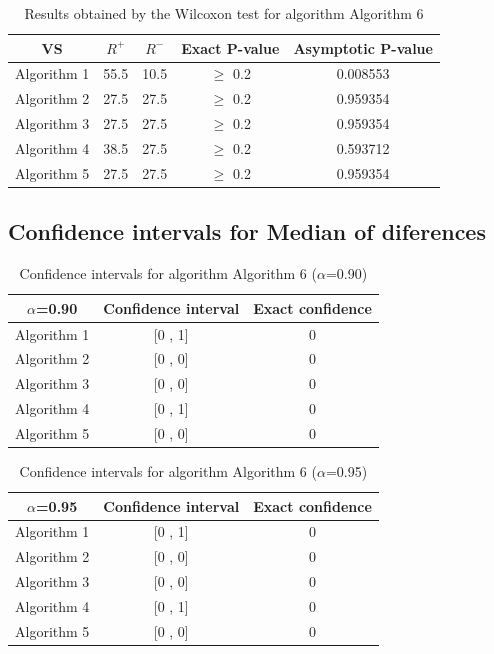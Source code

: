 \documentclass[a4paper,10pt]{article}
\begin{document}
\begin{table}[!htp]
\centering\small
\begin{tabular}{
|c|c|c|c|c|}
\hline
 VS & $R^{+}$ & $R^{-}$ & Exact P-value & Asymptotic P-value \\ \hline 
Algorithm 1 & 55.5 & 10.5 & $\geq$ 0.2 & 0.008553\\ \hline 
Algorithm 2 & 27.5 & 27.5 & $\geq$ 0.2 & 0.959354\\ \hline 
Algorithm 3 & 27.5 & 27.5 & $\geq$ 0.2 & 0.959354\\ \hline 
Algorithm 4 & 38.5 & 27.5 & $\geq$ 0.2 & 0.593712\\ \hline 
Algorithm 5 & 27.5 & 27.5 & $\geq$ 0.2 & 0.959354\\ \hline 

\end{tabular}
\caption{Results obtained by the Wilcoxon test for algorithm Algorithm 6}
\end{table}

\subsection{Confidence intervals for Median of diferences}

\begin{table}[!htp]
\centering\small
\begin{tabular}{
|c|c|c|}
\hline
 $\alpha$=0.90 & Confidence interval & Exact confidence \\ \hline 
Algorithm 1 & [0 , 1] & 0\\ \hline 
Algorithm 2 & [0 , 0] & 0\\ \hline 
Algorithm 3 & [0 , 0] & 0\\ \hline 
Algorithm 4 & [0 , 1] & 0\\ \hline 
Algorithm 5 & [0 , 0] & 0\\ \hline 

\end{tabular}
\caption{Confidence intervals for algorithm Algorithm 6 ($\alpha$=0.90)}
\end{table}
\begin{table}[!htp]
\centering\small
\begin{tabular}{
|c|c|c|}
\hline
 $\alpha$=0.95 & Confidence interval & Exact confidence \\ \hline 
Algorithm 1 & [0 , 1] & 0\\ \hline 
Algorithm 2 & [0 , 0] & 0\\ \hline 
Algorithm 3 & [0 , 0] & 0\\ \hline 
Algorithm 4 & [0 , 1] & 0\\ \hline 
Algorithm 5 & [0 , 0] & 0\\ \hline 

\end{tabular}
\caption{Confidence intervals for algorithm Algorithm 6 ($\alpha$=0.95)}
\end{table}

 \clearpage 
\end{document}

